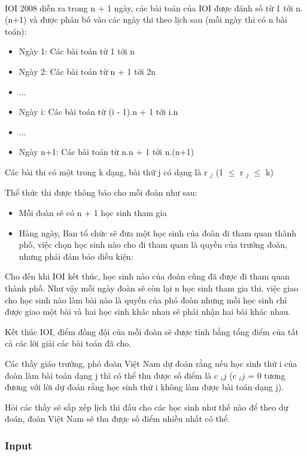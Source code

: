 

 

IOI 2008 diễn ra trong n + 1 ngày, các bài toán của IOI được đánh số từ 1 tới n.(n+1) và được phân bố vào các ngày thi theo lịch sau (mỗi ngày thi có n bài toán):
\begin{itemize}
	\item Ngày 1: Các bài toán từ 1 tới n
	\item Ngày 2: Các bài toán từ n + 1 tới 2n
	\item ...
	\item Ngày i: Các bài toán từ (i - 1).n + 1 tới i.n
	\item ...
	\item Ngày n+1: Các bài toán từ n.n + 1 tới n.(n+1)
\end{itemize}

Các bài thi có một trong k dạng, bài thứ j có dạng là r $_ j $ (1  $\le$  r $_ j $  $\le$  k)

Thể thức thi được thông báo cho mỗi đoàn như sau:
\begin{itemize}
	\item Mỗi đoàn sẽ có n + 1 học sinh tham gia
	\item Hàng ngày, Ban tổ chức sẽ đưa một học sinh của đoàn đi tham quan thành phố, việc chọn học sinh nào cho đi tham quan là quyền của trưởng đoàn, nhưng phải đảm bảo điều kiện:
\end{itemize}

Cho đến khi IOI kết thúc, học sinh nào của đoàn cũng đã được đi tham quan thành phố. Như vậy mỗi ngày đoàn sẽ còn lại n học sinh tham gia thi, việc giao cho học sinh nào làm bài nào là quyền của phó đoàn nhưng mỗi học sinh chỉ được giao một bài và hai học sinh khác nhau sẽ phải nhận hai bài khác nhau.

Kết thúc IOI, điểm đồng đội của mỗi đoàn sẽ được tính bằng tổng điểm của tất cả các lời giải các bài toán đã cho.

Các thầy giáo trưởng, phó đoàn Việt Nam dự đoán rằng nếu học sinh thứ i của đoàn làm bài toán dạng j thì có thể thu được số điểm là c $_ ij $ (c $_ ij $ = 0 tương đương với lời dự đoán rằng học sinh thứ i không làm được bài toán dạng j).

Hỏi các thầy sẽ sắp xếp lịch thi đấu cho các học sinh như thế nào để theo dự đoán, đoàn Việt Nam sẽ thu được số điểm nhiều nhất có thể.

\subsubsection{Input}

